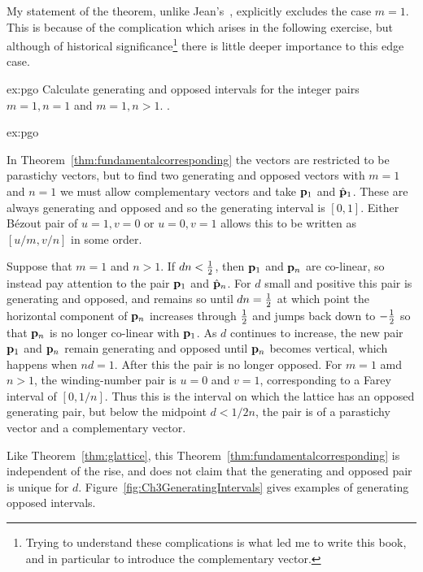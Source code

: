 My statement of the theorem, unlike Jean's~\autocite{jeanPhyllotaxisSystemicStudy1994}, explicitly excludes the case $m=1$. This is because of the complication which arises in the following exercise, but although of historical significance\footnote{Trying to understand these complications is what led me to write this book, and in particular to introduce the complementary vector.} there is little deeper importance to this edge case.

\begin{jExercise}{ex:pgo}
	Calculate generating and opposed intervals for the integer pairs $m=1,n=1$ and $m=1,n>1$.
	\label{ex:ftpfail}.
\end{jExercise}
\begin{jAnswer}{ex:pgo}
	
	In Theorem~\ref{thm:fundamentalcorresponding} the vectors are restricted to be parastichy vectors, but to find two generating and opposed vectors  with $m=1$ and $n=1$ we must allow complementary vectors and take ${\mathbf p}_{1}$ and $\hat{\mathbf p}_{1}$. 
	These are always generating and opposed and so the generating interval is $[0,1]$. 
	Either B\'ezout pair of $u=1, v=0$ or $u=0,v=1$ allows this to be written as $[u/m,v/n]$ in some order.
	
	Suppose that $m=1$ and $n>1$. If $dn<\textstyle{\frac{1}{2}}$, then ${\mathbf p}_{1}$ and ${\mathbf p}_{n}$ are co-linear, so instead pay attention to the pair ${\mathbf p}_{1}$ and $\hat{\mathbf p}_{n}$. For $d$ small and positive this pair is generating and opposed, and remains so until $dn=\textstyle{\frac{1}{2}}$ at which point the horizontal component of ${\mathbf p}_{n}$ increases through $\textstyle{\frac{1}{2}}$ and jumps back down to $-\textstyle{\frac{1}{2}}$ so that  ${\mathbf p}_{n}$ is no longer co-linear with ${\mathbf p}_{1}$. As $d$ continues to increase, the new pair ${\mathbf p}_{1}$ and ${\mathbf p}_{n}$ remain generating and opposed until
	 ${\mathbf p}_{n}$ becomes vertical, which happens when $nd=1$. After this the pair is no longer opposed.
	 	 For $m=1$ amd $n>1$, the winding-number pair is $u=0$ and $v=1$, corresponding to a Farey interval of $[0,1/n]$. Thus this is the interval on which the lattice has an opposed generating pair, but below the midpoint $d<1/2n$, the pair is of a parastichy vector and a complementary vector. 
	 

\end{jAnswer}

Like Theorem~\ref{thm:glattice}, this Theorem~\ref{thm:fundamentalcorresponding} is independent of the rise, and does not claim that the generating and opposed pair is unique for $d$. Figure~\ref{fig:Ch3GeneratingIntervals} gives examples of generating opposed intervals. %

